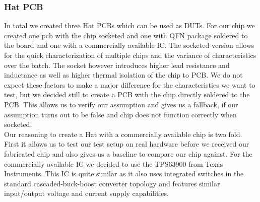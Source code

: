 \subsubsection{Hat PCB}
In total we created three Hat PCBs which can be used as DUTs. For our chip we created one pcb with the chip socketed and one with QFN package soldered to the board and one with a commercially available IC. The socketed version allows for the quick characterization of multiple chips and the variance of characteristics over the batch. The socket however introduces higher lead resistance and inductance as well as higher thermal isolation of the chip to PCB. We do not expect these factors to make a major difference for the characteristics we want to test, but we decided still to create a PCB with the chip directly soldered to the PCB. This allows us to verify our assumption and gives us a fallback, if our assumption turns out to be false and chip does not function correctly when socketed. \\

Our reasoning to create a Hat with a commercially available chip is two fold. First it allows us to test our test setup on real hardware before we received our fabricated chip and also gives us a baseline to compare our chip against. For the commercially available IC we decided to use the TPS63900 from Texas Instruments. This IC is quite similar as it also uses integrated switches in the standard cascaded-buck-boost converter topology and features similar input/output voltage and current supply capabilities. 

